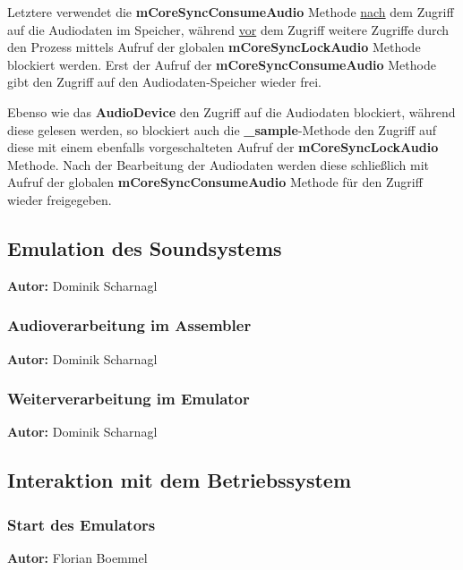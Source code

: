 \documentclass[11pt,a4paper]{scrartcl}
\newcommand{\AutorDominik} {
    \vspace{-4mm}
    \large \textbf{Autor:} Dominik Scharnagl \normalsize
    \vspace{2mm}
}
\newcommand{\AutorFlorian} {
    \vspace{-4mm}
    \large \textbf{Autor:} Florian Boemmel \normalsize
    \vspace{2mm}
}
\begin{document}
Letztere verwendet die \textbf{mCoreSyncConsumeAudio} Methode \underline{nach} dem Zugriff auf die Audiodaten im Speicher, w\"ahrend \underline{vor} dem Zugriff weitere Zugriffe durch den Prozess mittels Aufruf der globalen \textbf{mCoreSyncLockAudio} Methode blockiert werden. Erst der Aufruf der \textbf{mCoreSyncConsumeAudio} Methode gibt den Zugriff auf den Audiodaten-Speicher wieder frei.

Ebenso wie das \textbf{AudioDevice} den Zugriff auf die Audiodaten blockiert, w\"ahrend diese gelesen werden, so blockiert auch die \textbf{{\_}sample}-Methode den Zugriff auf diese mit einem ebenfalls vorgeschalteten Aufruf der \textbf{mCoreSyncLockAudio} Methode. Nach der Bearbeitung der Audiodaten werden diese schlie{\ss}lich mit Aufruf der globalen \textbf{mCoreSyncConsumeAudio} Methode f\"ur den Zugriff wieder freigegeben.

\newpage


\subsection{Emulation des Soundsystems} \label{EmulationSoundsystem}
\AutorDominik


\subsubsection{Audioverarbeitung im Assembler}
\AutorDominik


\subsubsection{Weiterverarbeitung im Emulator}
\AutorDominik


\newpage

\subsection{Interaktion mit dem Betriebssystem}

\subsubsection{Start des Emulators}
\AutorFlorian
\end{document}
